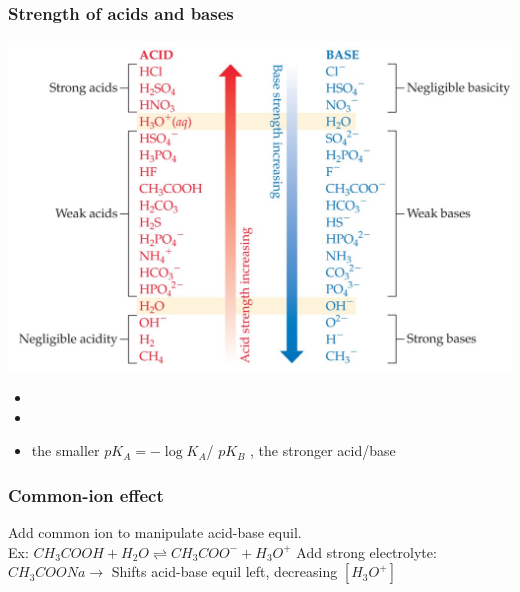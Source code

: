 \documentclass[ wastespaceontitle, english]{cheat_sheet_template}
\begin{document}
  
    
    \subsubsection{Strength of acids and bases}
      \begin{minipage}{0.5\linewidth}
     \includegraphics[width = \linewidth]{pictures/Strong acid base.png}
    \end{minipage}
    \begin{minipage}{0.49\linewidth}
     \begin{itemize}
        \item {} 
        \item {}
        \item the smaller $pK_A = - \log K_A$/ $pK_B$ , the stronger acid/base
    \end{itemize}
    \end{minipage}
    
    \subsubsection{Common-ion effect}
    Add common ion to manipulate acid-base equil. \\Ex:
    \(CH_3COOH + H_2O \rightleftharpoons CH_3COO^- + H_3O^+\)
    Add strong electrolyte: $CH_3COONa\rightarrow$ Shifts acid-base equil left, decreasing $[H_3O^+]$\\
\end{document}
